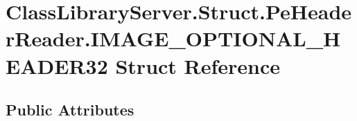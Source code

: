 \hypertarget{struct_class_library_server_1_1_struct_1_1_pe_header_reader_1_1_i_m_a_g_e___o_p_t_i_o_n_a_l___h_e_a_d_e_r32}{}\section{Class\+Library\+Server.\+Struct.\+Pe\+Header\+Reader.\+I\+M\+A\+G\+E\+\_\+\+O\+P\+T\+I\+O\+N\+A\+L\+\_\+\+H\+E\+A\+D\+E\+R32 Struct Reference}
\label{struct_class_library_server_1_1_struct_1_1_pe_header_reader_1_1_i_m_a_g_e___o_p_t_i_o_n_a_l___h_e_a_d_e_r32}
\subsection*{Public Attributes}

